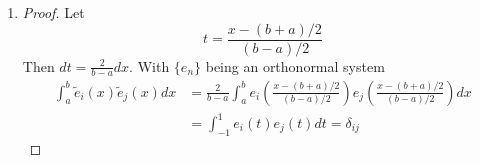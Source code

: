 \documentclass[paper=a4, fontsize=11pt]{scrartcl} %
\numberwithin{equation}{section} %
\numberwithin{figure}{section} %
\numberwithin{table}{section} %
\begin{document}
\begin{enumerate}
\begin{proof}
\begin{equation}
\begin{aligned}
					  = & - \frac{1}{2} [\frac{1}{(n+m)\pi} \int_{-(n+m)\pi}^{(n+m)\pi} cos(x) dx - \frac{1}{(n-m)\pi} \int_{-(n-m)\pi}^{(n-m)\pi} cos(x) dx] = 0
					\end{aligned}
				\end{equation}
				Then, when $n = m$ it's obvious that
				\begin{equation}
					\int_{-1}^{1} cos(n \pi x) cos(m \pi x) dx = \int_{-1}^{1} cos^2(n \pi x) dx > 0 
				\end{equation}
				and
				\begin{equation}
					\int_{-1}^{1} sin(n \pi x) sin(m \pi x) dx = \int_{-1}^{1} sin^2(n \pi x) dx > 0 
				\end{equation}
				Finally, no matter $n$ equals $m$ or not
				\begin{equation}
					\begin{aligned}
						& \int_{-1}^{1} sin(n \pi x) cos(m \pi x) dx \\
					  = & \frac{1}{2} [\int_{-1}^{1} sin[(n+m) \pi x] dx + \int_{-1}^{1} sin[(n-m) \pi x] dx]\\
					  = & \frac{1}{2} [\int_{-(n+m)\pi}^{(n+m)\pi} sin(x) dx + \int_{-(n-m)\pi}^{(n-m)\pi} sin(x) dx]\\
					  = & 0
					\end{aligned}
				\end{equation}
			\end{proof}
		\item 
			\begin{proof}
				Let
				\begin{equation}
					t = \frac{x - (b+a)/2}{(b-a)/2}
				\end{equation}
				Then $ dt = \frac{2}{b-a} dx $. With $\{ e_n\}$ being an orthonormal system
				\begin{equation}
					\begin{aligned}
						\int_{a}^{b} \tilde{e}_i(x) \tilde{e}_j(x) dx & = \frac{2}{b-a} \int_{a}^{b} e_i(\frac{x - (b+a)/2}{(b-a)/2}) e_j(\frac{x - (b+a)/2}{(b-a)/2}) dx\\
						& = \int_{-1}^{1} e_i(t) e_j(t) dt = \delta_{ij}
					\end{aligned}
				\end{equation}
			\end{proof}
		
	\end{enumerate}
\end{document}
